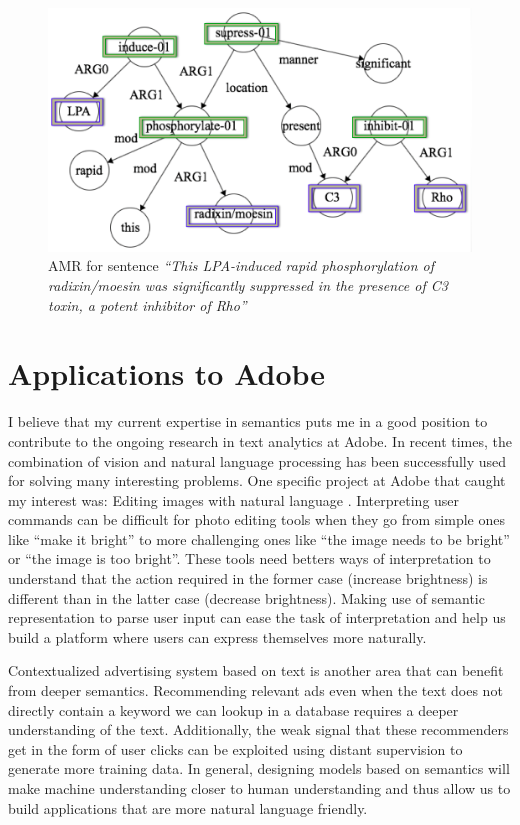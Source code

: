 \documentclass[11pt,a4paper]{article}
\begin{document}

\begin{figure}
\centering
\includegraphics[width = .5\textwidth]{EgAMR}
\caption{AMR for sentence \textit{``This LPA-induced rapid phosphorylation of radixin/moesin was significantly suppressed in the presence of C3 toxin, a potent inhibitor of Rho''}}
\label{amr_eg}
\end{figure}

\section{Applications to Adobe }
I believe that my current expertise in semantics puts me in a good position to contribute to the ongoing research in text analytics at Adobe. In recent times, the combination of vision and natural language processing has been successfully used for solving many interesting problems. One specific project at Adobe that caught my interest was: Editing images with natural language \cite{laput2013pixeltone}. Interpreting user commands can be difficult for photo editing tools when they go from simple ones like ``make it bright'' to more challenging ones like ``the image needs to be bright'' or ``the image is too bright''. These tools need betters ways of interpretation to understand that the action required in the former case (increase brightness) is different than in the latter case (decrease brightness). Making use of semantic representation to parse user input can ease the task of interpretation and help us build a platform where users can express themselves more naturally. 

Contextualized advertising system based on text is another area that can benefit from deeper semantics. Recommending relevant ads even when the text does not directly contain a keyword we can lookup in a database requires a deeper understanding of the text. Additionally, the weak signal that these recommenders get in the form of user clicks can be exploited using distant supervision to generate more training data. In general, designing models based on semantics will make machine understanding closer to human understanding and thus allow us to build applications that are more natural language friendly. 



\end{document}
